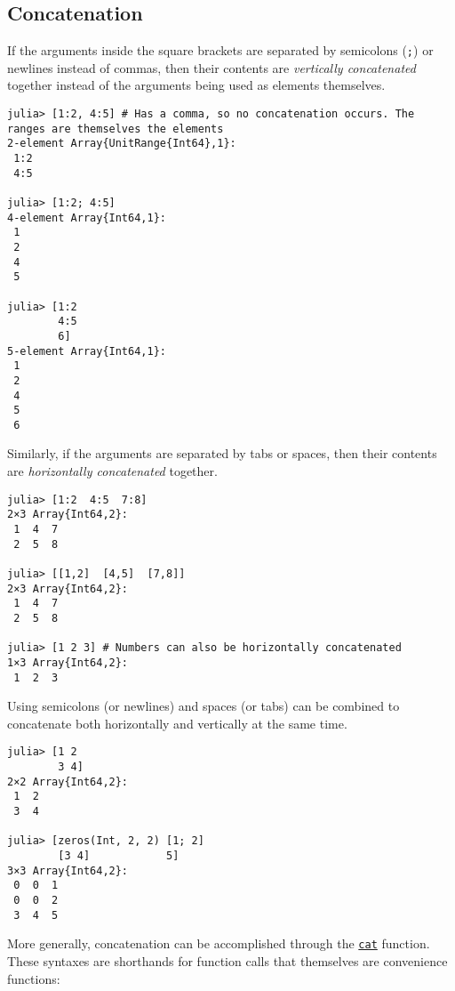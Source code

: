\hypertarget{8665822927896221545}{}


\subsection{Concatenation}



If the arguments inside the square brackets are separated by semicolons (\texttt{;}) or newlines instead of commas, then their contents are \emph{vertically concatenated} together instead of the arguments being used as elements themselves.




\begin{verbatim}
julia> [1:2, 4:5] # Has a comma, so no concatenation occurs. The ranges are themselves the elements
2-element Array{UnitRange{Int64},1}:
 1:2
 4:5

julia> [1:2; 4:5]
4-element Array{Int64,1}:
 1
 2
 4
 5

julia> [1:2
        4:5
        6]
5-element Array{Int64,1}:
 1
 2
 4
 5
 6
\end{verbatim}



Similarly, if the arguments are separated by tabs or spaces, then their contents are \emph{horizontally concatenated} together.




\begin{verbatim}
julia> [1:2  4:5  7:8]
2×3 Array{Int64,2}:
 1  4  7
 2  5  8

julia> [[1,2]  [4,5]  [7,8]]
2×3 Array{Int64,2}:
 1  4  7
 2  5  8

julia> [1 2 3] # Numbers can also be horizontally concatenated
1×3 Array{Int64,2}:
 1  2  3
\end{verbatim}



Using semicolons (or newlines) and spaces (or tabs) can be combined to concatenate both horizontally and vertically at the same time.




\begin{verbatim}
julia> [1 2
        3 4]
2×2 Array{Int64,2}:
 1  2
 3  4

julia> [zeros(Int, 2, 2) [1; 2]
        [3 4]            5]
3×3 Array{Int64,2}:
 0  0  1
 0  0  2
 3  4  5
\end{verbatim}



More generally, concatenation can be accomplished through the \hyperlink{9868138443525443234}{\texttt{cat}} function. These syntaxes are shorthands for function calls that themselves are convenience functions:





